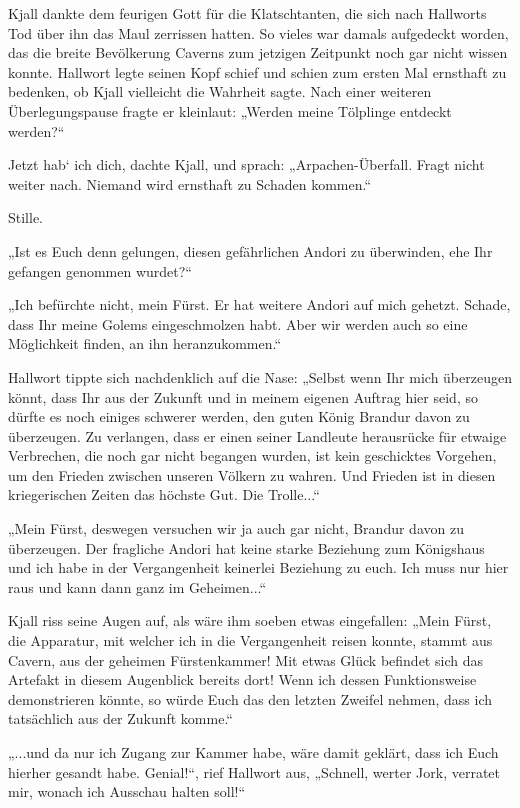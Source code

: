 Kjall dankte dem feurigen Gott für die Klatschtanten, die sich nach Hallworts Tod über ihn das Maul zerrissen hatten. So vieles war damals aufgedeckt worden, das die breite Bevölkerung Caverns zum jetzigen Zeitpunkt noch gar nicht wissen konnte. Hallwort legte seinen Kopf schief und schien zum ersten Mal ernsthaft zu bedenken, ob Kjall vielleicht die Wahrheit sagte. Nach einer weiteren Überlegungspause fragte er kleinlaut: „Werden meine Tölplinge entdeckt werden?“

Jetzt hab‘ ich dich, dachte Kjall, und sprach: „Arpachen-Überfall. Fragt nicht weiter nach. Niemand wird ernsthaft zu Schaden kommen.“

Stille.

„Ist es Euch denn gelungen, diesen gefährlichen Andori zu überwinden, ehe Ihr gefangen genommen wurdet?“

„Ich befürchte nicht, mein Fürst. Er hat weitere Andori auf mich gehetzt. Schade, dass Ihr meine Golems eingeschmolzen habt. Aber wir werden auch so eine Möglichkeit finden, an ihn heranzukommen.“

Hallwort tippte sich nachdenklich auf die Nase: „Selbst wenn Ihr mich überzeugen könnt, dass Ihr aus der Zukunft und in meinem eigenen Auftrag hier seid, so dürfte es noch einiges schwerer werden, den guten König Brandur davon zu überzeugen. Zu verlangen, dass er einen seiner Landleute herausrücke für etwaige Verbrechen, die noch gar nicht begangen wurden, ist kein geschicktes Vorgehen, um den Frieden zwischen unseren Völkern zu wahren. Und Frieden ist in diesen kriegerischen Zeiten das höchste Gut. Die Trolle...“

„Mein Fürst, deswegen versuchen wir ja auch gar nicht, Brandur davon zu überzeugen. Der fragliche Andori hat keine starke Beziehung zum Königshaus und ich habe in der Vergangenheit keinerlei Beziehung zu euch. Ich muss nur hier raus und kann dann ganz im Geheimen...“

Kjall riss seine Augen auf, als wäre ihm soeben etwas eingefallen: „Mein Fürst, die Apparatur, mit welcher ich in die Vergangenheit reisen konnte, stammt aus Cavern, aus der geheimen Fürstenkammer! Mit etwas Glück befindet sich das Artefakt in diesem Augenblick bereits dort! Wenn ich dessen Funktionsweise demonstrieren könnte, so würde Euch das den letzten Zweifel nehmen, dass ich tatsächlich aus der Zukunft komme.“

„...und da nur ich Zugang zur Kammer habe, wäre damit geklärt, dass ich Euch hierher gesandt habe. Genial!“, rief Hallwort aus, „Schnell, werter Jork, verratet mir, wonach ich Ausschau halten soll!“

